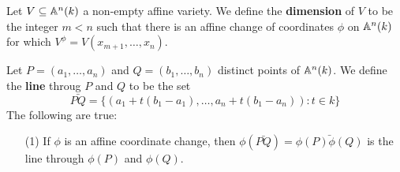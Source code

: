 \begin{definition}
  Let $V \subseteq \mathbb{A}^n(k)$ a non-empty affine variety. We define the
  \textbf{dimension} of $V$ to be the integer $m<n$ such that there is an affine
  change of coordinates $\phi$ on $\mathbb{A}^n(k)$ for which $V^\phi=V(x_{m+1}, \dots,
  x_n)$.
\end{definition}

\begin{example}\label{example_2.4}
  Let $P=(a_1, \dots, a_n)$ and $Q=(b_1, \dots, b_n)$ distinct points of
  $\mathbb{A}^n(k)$. We define the \textbf{line} throug $P$ and $Q$ to be the set
  \begin{equation*}
    \bar{PQ}=\{(a_1+t(b_1-a_1), \dots, a_n+t(b_1-a_n)) : t \in k\}
  \end{equation*}
  The following are true:
  \begin{enumerate}
    \item[(1)] If $\phi$ is an affine coordinate change, then
      $\phi(\bar{PQ})=\bar{\phi(P)\phi(Q)}$ is the line through $\phi(P)$ and
      $\phi(Q)$.


  \end{enumerate}
\end{example}


